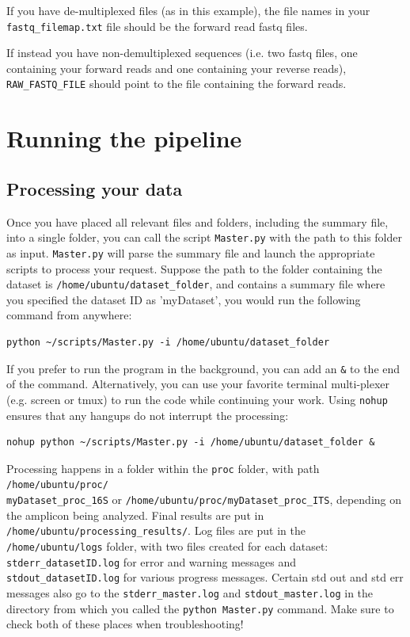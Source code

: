 \documentclass[11pt, oneside]{article}   	%
\begin{document}
If you have de-multiplexed files (as in this example), the file names in your 
{\tt fastq\_filemap.txt} file should be the forward read fastq files.

If instead you have non-demultiplexed sequences (i.e. two fastq files, one containing your
forward reads and one containing your reverse reads), {\tt RAW\_FASTQ\_FILE} should point
to the file containing the forward reads.

\section{Running the pipeline}

\subsection{Processing your data}
Once you have placed all relevant files and folders, including the summary file, into a single folder, you can call the script {\tt Master.py} with the path to this folder as input.  {\tt Master.py} will parse the summary file and launch the appropriate scripts to process your request.  Suppose the path to the folder containing the dataset is {\tt /home/ubuntu/dataset\_folder}, and contains a summary file where you specified the dataset ID as 'myDataset', you would run the following command from anywhere:
\begin{verbatim}
python ~/scripts/Master.py -i /home/ubuntu/dataset_folder
\end{verbatim}

If you prefer to run the program in the background, you can add an {\tt \&} to 
the end of the command. Alternatively, you can use your favorite terminal
multi-plexer (e.g. screen or tmux) to run the code while continuing your work.
Using {\tt nohup} ensures that any hangups do not interrupt the processing:

\begin{verbatim}
nohup python ~/scripts/Master.py -i /home/ubuntu/dataset_folder &
\end{verbatim}

Processing happens in a folder within the {\tt proc} folder, with path {\tt /home/ubuntu/proc/ \\ myDataset\_proc\_16S} or {\tt /home/ubuntu/proc/myDataset\_proc\_ITS}, depending on the amplicon being analyzed.  Final results are put in {\tt /home/ubuntu/processing\_results/}. Log files are put in the {\tt /home/ubuntu/logs} folder, with two files created for each dataset: {\tt stderr\_datasetID.log} for error and warning messages and {\tt stdout\_datasetID.log} for various progress messages. Certain std out and std err messages also go to
the \texttt{stderr\_master.log} and \texttt{stdout\_master.log} in the directory
from which you called the \texttt{python Master.py} command. Make sure to check
both of these places when troubleshooting! 
\end{document}
